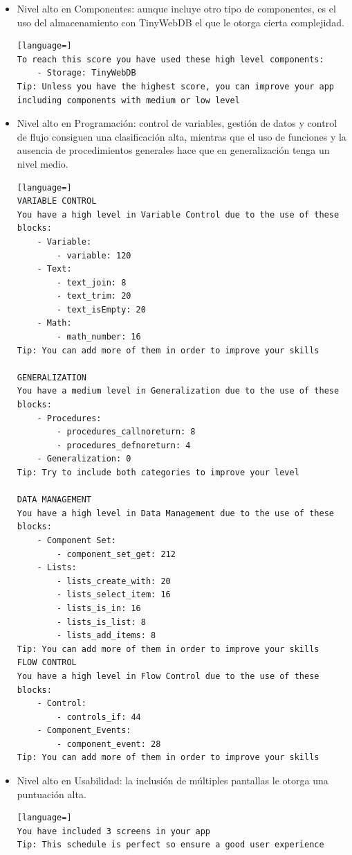 \documentclass[a4paper, 12pt]{book}
\begin{document}
\begin{itemize}
  \item Nivel alto en Componentes: aunque incluye otro tipo de componentes, es el uso del almacenamiento con TinyWebDB el que le otorga cierta complejidad.
\begin{lstlisting}[language=]
To reach this score you have used these high level components:
    - Storage: TinyWebDB
Tip: Unless you have the highest score, you can improve your app including components with medium or low level
\end{lstlisting}
  \item Nivel alto en Programación: control de variables, gestión de datos y control de flujo consiguen una clasificación alta, mientras que el uso de funciones y la ausencia de procedimientos generales hace que en generalización tenga un nivel medio. 
\begin{lstlisting}[language=]
VARIABLE CONTROL
You have a high level in Variable Control due to the use of these blocks:
    - Variable:
        - variable: 120
    - Text:
        - text_join: 8
        - text_trim: 20
        - text_isEmpty: 20
    - Math:
        - math_number: 16
Tip: You can add more of them in order to improve your skills

GENERALIZATION
You have a medium level in Generalization due to the use of these blocks:
    - Procedures:
        - procedures_callnoreturn: 8
        - procedures_defnoreturn: 4
    - Generalization: 0
Tip: Try to include both categories to improve your level

DATA MANAGEMENT
You have a high level in Data Management due to the use of these blocks:
    - Component Set:
        - component_set_get: 212
    - Lists:
        - lists_create_with: 20
        - lists_select_item: 16
        - lists_is_in: 16
        - lists_is_list: 8
        - lists_add_items: 8
Tip: You can add more of them in order to improve your skills
FLOW CONTROL 
You have a high level in Flow Control due to the use of these blocks:
    - Control:
        - controls_if: 44
    - Component_Events:
        - component_event: 28
Tip: You can add more of them in order to improve your skills
\end{lstlisting}
  \item Nivel alto en Usabilidad: la inclusión de múltiples pantallas le otorga una puntuación alta. 
\begin{lstlisting}[language=]
You have included 3 screens in your app
Tip: This schedule is perfect so ensure a good user experience 
\end{lstlisting}
\end{itemize}
\end{document}
